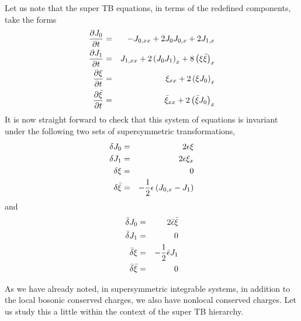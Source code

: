 \documentclass[a4paper,11pt]{article}
\begin{document}
Let us note that the super TB equations, in terms of the redefined
components, take the forms
\begin{eqnarray}
{\partial J_{0}\over \partial t} & = & - J_{0,xx} + 2 J_{0}J_{0,x} + 2
J_{1,x}\nonumber\\
{\partial J_{1}\over \partial t} & = & J_{1,xx} + 2
\left(J_{0}J_{1}\right)_{x} + 8
\left(\xi\bar{\xi}\right)_{x}\nonumber\\
{\partial \xi\over \partial t} & = & \xi_{xx} + 2 \left(\xi
J_{0}\right)_{x}\nonumber\\
{\partial \bar{\xi}\over \partial t} & = & \bar{\xi}_{xx} + 2
\left(\bar{\xi}J_{0}\right)_{x}
\end{eqnarray}
It is now straight forward to check that this system of equations is
invariant under the following two sets of supersymmetric transformations,
\begin{eqnarray}
\delta J_{0} & = & 2 \epsilon \xi\nonumber\\
\delta J_{1} & = & 2 \epsilon \xi_{x}\nonumber\\
\delta \xi & = & 0\nonumber\\
\delta \bar{\xi} & = & - {1\over 2} \epsilon \left(J_{0,x} -
J_{1}\right)
\end{eqnarray}
and
\begin{eqnarray}
\bar{\delta} J_{0} & = & 2 \bar{\epsilon} \bar{\xi}\nonumber\\
\bar{\delta} J_{1} & = & 0\nonumber\\
\bar{\delta} \xi & = & - {1\over 2} \bar{\epsilon} J_{1}\nonumber\\
\bar{\delta} \bar{\xi} & = & 0
\end{eqnarray}


As we have already noted, in supersymmetric integrable systems, in
addition to the local bosonic conserved charges, we also have nonlocal
conserved charges. Let us study this a little within the context of
the super TB hierarchy.
\end{document}
